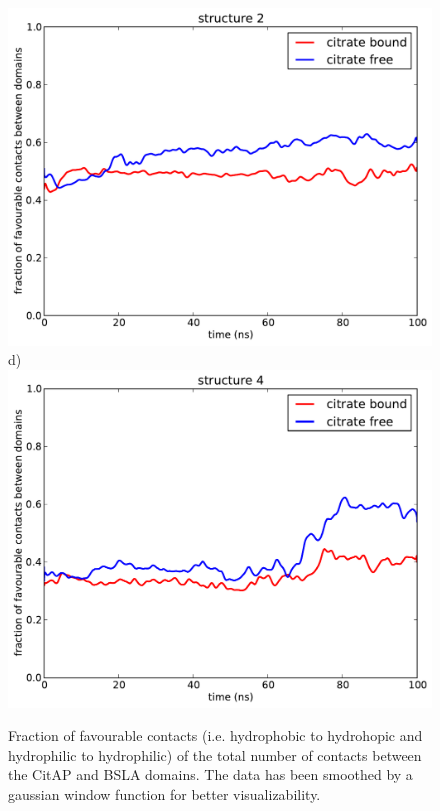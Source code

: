 \documentclass[english, a4paper, 12pt, titlepage, draft]{article}
\begin{document}
\begin{figure}
\begin{minipage}[]{0.45\linewidth}
        \includegraphics[width=\textwidth]{figures/Complex_hydrophobic_core/favourable_cont_structure2.pdf}  
        d)
        \includegraphics[width=\textwidth]{figures/Complex_hydrophobic_core/favourable_cont_structure4.pdf}  
    \end{minipage}
    \caption{Fraction of favourable contacts (i.e. hydrophobic to hydrohopic and hydrophilic to hydrophilic) of the total number of contacts between the CitAP and BSLA domains.
        The data has been smoothed by a gaussian window function for better visualizability.}
\label{fig:favourable_contacts}
\end{figure}   
\end{document}
